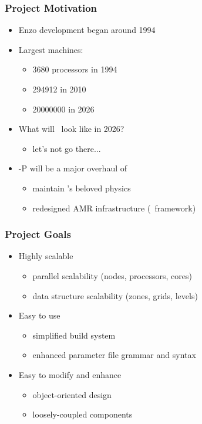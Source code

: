 
\begin{frame}[fragile] 
\frametitle{Project Motivation}
\begin{itemize}
\item Enzo development began around 1994
\item Largest machines:
\begin{itemize}
\item    3680 processors in 1994
\item    294912  in 2010
\item    20000000 in 2026
\end{itemize}
\item What will \enzo\ look like in 2026?
\begin{itemize}
\item    let's not go there...
\end{itemize}
\item \enzo-P will be a major overhaul of \enzo
\begin{itemize}
\item    maintain \enzo's beloved physics
\item    redesigned AMR infrastructure (\cello\ framework)
\end{itemize}
\end{itemize}
\end{frame}

\begin{frame}[fragile] 
\frametitle{Project Goals}
\begin{itemize}
\item{Highly scalable}
\begin{itemize}
\item parallel scalability (nodes, processors, cores)
\item data structure scalability (zones, grids, levels)
\end{itemize}
\item{Easy to use}
\begin{itemize}
\item simplified build system
\item enhanced parameter file grammar and syntax
\end{itemize}
\item{Easy to modify and enhance}
\begin{itemize}
\item object-oriented design
\item loosely-coupled components
\end{itemize}
\end{itemize}
\end{frame}

